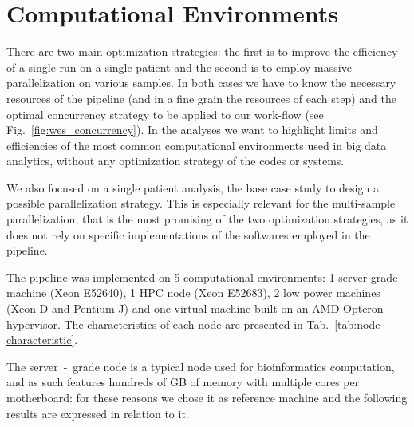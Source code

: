 \documentclass{standalone}
\begin{document}
\section*{Computational Environments}

\begin{figure*}
\centering
\def\svgwidth{.6\textwidth}

\caption{Examples of concurrency work-flow of two processes.
The first case ($a$) represents a simple (naive) sequential work-flow; the second ($b$) highlights a brute force parallelization; the third ($c$) is the case of a perfect match between the available resources and the requested resources.
Often brute force parallelization of pipelines done as in the image $b$ ends up overlapping the most computationally intensive steps.
Measuring the minimum viable requirements for the execution allow to better allocate resources as seen in the image $c$.}
\label{fig:wes_concurrency}
\end{figure*}

There are two main optimization strategies: the first is to improve the efficiency of a single run on a single patient and the second is to employ massive parallelization on various samples.
In both cases we have to know the necessary resources of the pipeline (and in a fine grain the resources of each step) and the optimal concurrency strategy to be applied to our work-flow (see Fig.~\ref{fig:wes_concurrency}).
In the analyses we want to highlight limits and efficiencies of the most common computational environments used in big data analytics, without any optimization strategy of the codes or systems.

We also focused on a single patient analysis, the base case study to design a possible parallelization strategy.
This is especially relevant for the multi-sample parallelization, that is the most promising of the two optimization strategies, as it does not rely on specific implementations of the softwares employed in the pipeline.

The pipeline was implemented on 5 computational environments: 1 server grade machine (Xeon E52640), 1 HPC node (Xeon E52683), 2 low power machines (Xeon D and Pentium J) and one virtual machine built on an AMD Opteron hypervisor.
The characteristics of each node are presented in Tab.~\ref{tab:node-characteristic}.

The server~-~grade node is a typical node used for bioinformatics computation, and as such features hundreds of GB of memory with multiple cores per motherboard: for these reasons we chose it as reference machine and the following results are expressed in relation to it.
\end{document}
